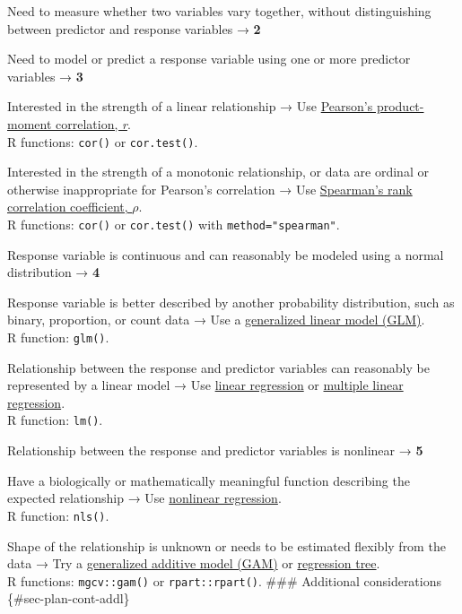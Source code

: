 \documentclass[
  13,
  letterpaper,
]{report}
\providecommand{\tightlist}{%
  \setlength{\itemsep}{0pt}\setlength{\parskip}{0pt}}
\begin{document}
\begin{description}
\tightlist
\item[\textbf{1.}]
Need to measure whether two variables vary together, without
distinguishing between predictor and response variables → \textbf{2}
\item[\textbf{1′.}]
Need to model or predict a response variable using one or more predictor
variables → \textbf{3}
\item[\textbf{2.}]
Interested in the strength of a linear relationship → Use
\href{@sec-lin-cor-lin}{Pearson's product-moment correlation,
\emph{r}}.\\
R functions: \texttt{cor()} or \texttt{cor.test()}.
\item[\textbf{2′.}]
Interested in the strength of a monotonic relationship, or data are
ordinal or otherwise inappropriate for Pearson's correlation → Use
\href{@sec-lin-cor-non}{Spearman's rank correlation coefficient,
\(\rho\)}.\\
R functions: \texttt{cor()} or \texttt{cor.test()} with
\texttt{method="spearman"}.
\item[\textbf{3.}]
Response variable is continuous and can reasonably be modeled using a
normal distribution → \textbf{4}
\item[\textbf{3′.}]
Response variable is better described by another probability
distribution, such as binary, proportion, or count data → Use a
\href{@sec-glm1}{generalized linear model (GLM)}.\\
R function: \texttt{glm()}.
\item[\textbf{4.}]
Relationship between the response and predictor variables can reasonably
be represented by a linear model → Use \href{@sec-lin-reg}{linear
regression} or \href{@sec-lin-mult}{multiple linear regression}.\\
R function: \texttt{lm()}.
\item[\textbf{4′.}]
Relationship between the response and predictor variables is nonlinear →
\textbf{5}
\item[\textbf{5.}]
Have a biologically or mathematically meaningful function describing the
expected relationship → Use \href{@sec-non-nls}{nonlinear regression}.\\
R function: \texttt{nls()}.
\item[\textbf{5′.}]
Shape of the relationship is unknown or needs to be estimated flexibly
from the data → Try a \href{@sec-non-gam}{generalized additive model
(GAM)} or \href{@sec-non-cart}{regression tree}.\\
R functions: \texttt{mgcv::gam()} or \texttt{rpart::rpart()}. \#\#\#
Additional considerations \{\#sec-plan-cont-addl\}
\end{description}
\end{document}
